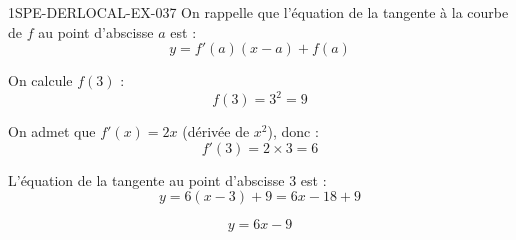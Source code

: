 \begin{corrige}{1SPE-DERLOCAL-EX-037}
On rappelle que l'équation de la tangente à la courbe de $f$ au point d'abscisse $a$ est :
\[
y = f'(a)(x - a) + f(a)
\]

On calcule $f(3)$ :
\[
f(3) = 3^2 = 9
\]

On admet que $f'(x) = 2x$ (dérivée de $x^2$), donc :
\[
f'(3) = 2 \times 3 = 6
\]

L'équation de la tangente au point d'abscisse $3$ est :
\[
y = 6(x - 3) + 9 = 6x - 18 + 9
\]

\[
\boxed{y = 6x - 9}
\]
\end{corrige}
